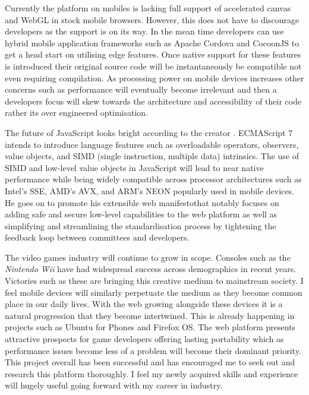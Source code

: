 \documentclass[final]{cmpreport}
\begin{document}
Currently the platform on mobiles is lacking full support of accelerated canvas and WebGL in stock mobile browsers. However, this does not have to discourage developers as the support is on its way. In the mean time developers can use hybrid mobile application frameworks such as Apache Cordova and CocoonJS to get a head start on utilising edge features. Once native support for these features is introduced their original source code will be instantaneously be compatible not even requiring compilation. As processing power on mobile devices increases other concerns such as performance will eventually become irrelevant and then a developers focus will skew towards the architecture and accessibility of their code rather its over engineered optimisation.

The future of JavaScript looks bright according to the creator \citet{Eich}. ECMAScript 7 intends to introduce language features such as overloadable operators, observers, value objects, and SIMD (single instruction, multiple data) intrinsics. The use of SIMD and low-level value objects in JavaScript will lead to near native performance while being widely compatible across processor architectures such as Intel's SSE, AMD's AVX, and ARM's NEON popularly used in mobile devices. He goes on to promote his extensible web manifesto\footnotemark that notably focuses on adding safe and secure low-level capabilities to the web platform as well as simplifying and streamlining the standardisation process by tightening the feedback loop between committees and developers.


The video games industry will continue to grow in scope. Consoles such as the \textit{Nintendo Wii} have had widespread success across demographics in recent years. Victories such as these are bringing this creative medium to mainstream society. I feel mobile devices will similarly perpetuate the medium as they become common place in our daily lives. With the web growing alongside these devices it is a natural progression that they become intertwined. This is already happening in projects such as Ubuntu for Phones and Firefox OS. The web platform presents attractive prospects for game developers offering lasting portability which as performance issues become less of a problem will become their dominant priority. This project overall has been successful and has encouraged me to seek out and research this platform thoroughly. I feel my newly acquired skills and experience will hugely useful going forward with my career in industry.

\clearpage

\end{document}
